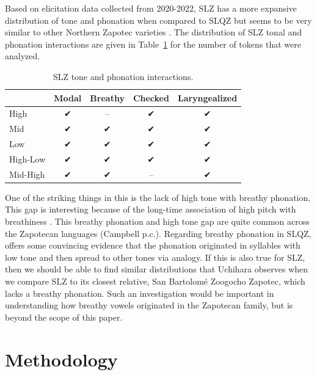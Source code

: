 \documentclass[12pt, letterpaper]{article}
\providecommand{\lsptoprule}{\midrule\toprule}
\providecommand{\lspbottomrule}{\bottomrule\midrule}
\begin{document}
Based on elicitation data collected from 2020-2022, SLZ has a more expansive distribution of tone and phonation when compared to SLQZ but seems to be very similar to other Northern Zapotec varieties \citep[e.g.,][]{avelinobecerraTopicsYalalagZapotec2004}. The distribution of SLZ tonal and phonation interactions are given in Table~\ref{tab:ToneVoiceQuality} for the number of tokens that were analyzed. 
\begin{table}[!h]
	\caption{SLZ tone and phonation interactions.}
	\label{tab:ToneVoiceQuality}
	\centering

	\begin{tabular}{lcccc}
	\lsptoprule
		& \textbf{Modal} & \textbf{Breathy} & \textbf{Checked} & \textbf{Laryngealized} \\
	\hline
	High		& ✔︎ & -- & ✔︎ & ✔︎ \\
	Mid			& ✔︎ & ✔︎ & ✔︎ & ✔︎ \\
	Low			& ✔︎ & ✔︎ & ✔︎ & ✔︎ \\
	High-Low	& ✔︎ & ✔︎ & ✔︎ & ✔︎ \\
	Mid-High	& ✔︎	& ✔︎ & -- & ✔︎ \\
	\lspbottomrule
	\end{tabular}
\end{table}

One of the striking things in this is the lack of high tone with breathy phonation. This gap is interesting because of the long-time association of high pitch with breathiness \citep[a good overview–of this association and other phonation types–is found in][]{eslingVoiceQualityLaryngeal2019}. This breathy phonation and high tone gap are quite common across the Zapotecan languages (Campbell p.c.). Regarding breathy phonation in SLQZ, \citet{uchiharaToneRegistrogenesisQuiavini2016} offers some convincing evidence that the phonation originated in syllables with low tone and then spread to other tones via analogy. If this is also true for SLZ, then we should be able to find similar distributions that Uchihara observes when we compare SLZ to its closest relative, San Bartolomé Zoogocho Zapotec, which lacks a breathy phonation. Such an investigation would be important in understanding how breathy vowels originated in the Zapotecan family, but is beyond the scope of this paper.  

 

\section{Methodology} \label{sec:Methods}
\end{document}
